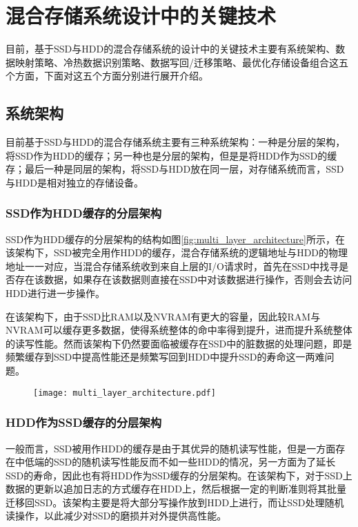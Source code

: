 \section{混合存储系统设计中的关键技术}

目前，基于SSD与HDD的混合存储系统的设计中的关键技术主要有系统架构、数据映射策略、冷热数据识别策略、数据写回/迁移策略、最优化存储设备组合这五个方面，下面对这五个方面分别进行展开介绍。

\subsection{系统架构}

目前基于SSD与HDD的混合存储系统主要有三种系统架构：一种是分层的架构，将SSD作为HDD的缓存；另一种也是分层的架构，但是是将HDD作为SSD的缓存；最后一种是同层的架构，将SSD与HDD放在同一层，对存储系统而言，SSD与HDD是相对独立的存储设备。

\subsubsection{SSD作为HDD缓存的分层架构}

SSD作为HDD缓存的分层架构的结构如图\ref{fig:multi_layer_architecture}所示，在该架构下，SSD被完全用作HDD的缓存，混合存储系统的逻辑地址与HDD的物理地址一一对应，当混合存储系统收到来自上层的I/O请求时，首先在SSD中找寻是否存在该数据，如果存在该数据则直接在SSD中对该数据进行操作，否则会去访问HDD进行进一步操作。

在该架构下，由于SSD比RAM以及NVRAM有更大的容量，因此较RAM与NVRAM可以缓存更多数据，使得系统整体的命中率得到提升，进而提升系统整体的读写性能。然而该架构下仍然要面临被缓存在SSD中的脏数据的处理问题，即是频繁缓存到SSD中提高性能还是频繁写回到HDD中提升SSD的寿命这一两难问题。

\begin{figure}[!htp]
    \centering
    \texttt{[image: multi\_layer\_architecture.pdf]}
\end{figure}

\subsubsection{HDD作为SSD缓存的分层架构}

一般而言，SSD被用作HDD的缓存是由于其优异的随机读写性能，但是一方面存在中低端的SSD的随机读写性能反而不如一些HDD的情况，另一方面为了延长SSD的寿命，因此也有将HDD作为SSD缓存的分层架构\cite{soundararajan2010extending}。在该架构下，对于SSD上数据的更新以追加日志的方式缓存在HDD上，然后根据一定的判断准则将其批量迁移回SSD。该架构主要是将大部分写操作放到HDD上进行，而让SSD处理随机读操作，以此减少对SSD的磨损并对外提供高性能。

